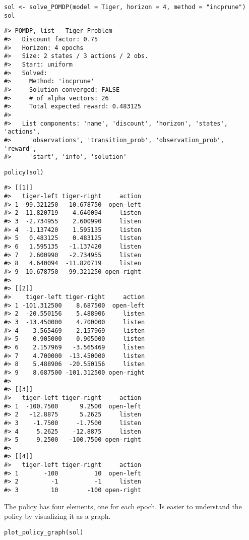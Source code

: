 \begin{verbatim}
sol <- solve_POMDP(model = Tiger, horizon = 4, method = "incprune")
sol
\end{verbatim}

\begin{verbatim}
#> POMDP, list - Tiger Problem
#>   Discount factor: 0.75
#>   Horizon: 4 epochs
#>   Size: 2 states / 3 actions / 2 obs.
#>   Start: uniform
#>   Solved:
#>     Method: 'incprune'
#>     Solution converged: FALSE
#>     # of alpha vectors: 26
#>     Total expected reward: 0.483125
#> 
#>   List components: 'name', 'discount', 'horizon', 'states', 'actions',
#>     'observations', 'transition_prob', 'observation_prob', 'reward',
#>     'start', 'info', 'solution'
\end{verbatim}

\begin{verbatim}
policy(sol)
\end{verbatim}

\begin{verbatim}
#> [[1]]
#>   tiger-left tiger-right     action
#> 1 -99.321250   10.678750  open-left
#> 2 -11.820719    4.640094     listen
#> 3  -2.734955    2.600990     listen
#> 4  -1.137420    1.595135     listen
#> 5   0.483125    0.483125     listen
#> 6   1.595135   -1.137420     listen
#> 7   2.600990   -2.734955     listen
#> 8   4.640094  -11.820719     listen
#> 9  10.678750  -99.321250 open-right
#> 
#> [[2]]
#>    tiger-left tiger-right     action
#> 1 -101.312500    8.687500  open-left
#> 2  -20.550156    5.488906     listen
#> 3  -13.450000    4.700000     listen
#> 4   -3.565469    2.157969     listen
#> 5    0.905000    0.905000     listen
#> 6    2.157969   -3.565469     listen
#> 7    4.700000  -13.450000     listen
#> 8    5.488906  -20.550156     listen
#> 9    8.687500 -101.312500 open-right
#> 
#> [[3]]
#>   tiger-left tiger-right     action
#> 1  -100.7500      9.2500  open-left
#> 2   -12.8875      5.2625     listen
#> 3    -1.7500     -1.7500     listen
#> 4     5.2625    -12.8875     listen
#> 5     9.2500   -100.7500 open-right
#> 
#> [[4]]
#>   tiger-left tiger-right     action
#> 1       -100          10  open-left
#> 2         -1          -1     listen
#> 3         10        -100 open-right
\end{verbatim}

The policy has four elements, one for each epoch. Is easier to understand the
policy by visualizing it as a graph.

\begin{verbatim}
plot_policy_graph(sol)
\end{verbatim}

